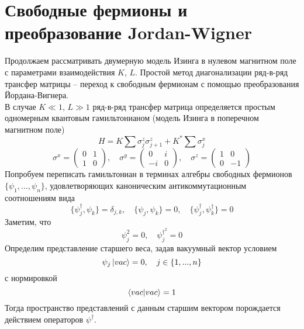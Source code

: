 \documentclass[12pt]{article}
\theoremstyle{definition}
\begin{document}
\section{Свободные фермионы и преобразование Jordan-Wigner}
Продолжаем рассматривать двумерную модель Изинга в нулевом магнитном поле с параметрами взаимодействия $K$, $L$. Простой метод диагонализации ряд-в-ряд трансфер матрицы -- переход к свободным фермионам с помощью преобразования Йордана-Вигнера.\\
В случае $K\ll1$, $L\gg1$ ряд-в-ряд трансфер матрица определяется простым одномерным квантовым гамильтонианом (модель Изинга в поперечном магнитном поле)
\begin{equation}
    H=K\sum\sigma_j^z\sigma_{j+1}^z+K^*\sum\sigma_j^x
\end{equation}
\begin{equation}
    \sigma^x=\begin{pmatrix}
        0 & 1\\
        1 & 0
    \end{pmatrix},\quad \sigma^y=\begin{pmatrix}
        0 & i\\
        -i & 0
    \end{pmatrix},\quad\sigma^z=\begin{pmatrix}
        1 & 0\\
        0 & -1
    \end{pmatrix}
\end{equation}
Попробуем переписать гамильтониан в терминах алгебры свободных фермионов $\{\psi_1,...,\psi_n\}$, удовлетворяющих каноническим антикоммутационным соотношениям вида
\begin{equation}
    \{\psi^\dagger_j,\psi_k\}=\delta_{j,k},\quad \{\psi_j,\psi_k\}=0,\quad \{\psi^\dagger_j,\psi^\dagger_k\}=0
\end{equation}
Заметим, что
\begin{equation}
    \psi_j^2=0,\quad\psi_j^{\dagger^2}=0
\end{equation}
Определим представление старшего веса, задав вакуумный вектор условием
\begin{equation}
    \psi_j\ket{vac}=0,\quad j\in\{1,...,n\}
\end{equation}
с нормировкой
\begin{equation}
    \braket{vac|vac}=1
\end{equation}
Тогда пространство представлений с данным старшим вектором порождается действием операторов $\psi^\dagger$.
\end{document}
